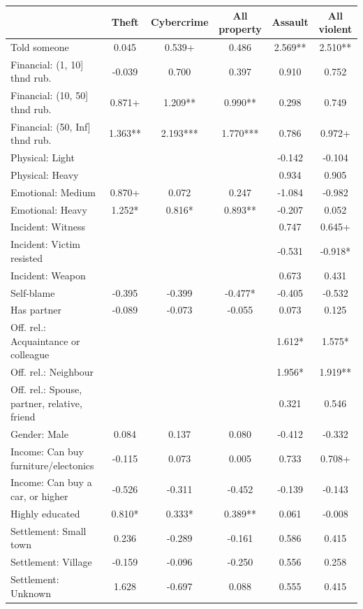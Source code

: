 \begin{tabular}{lccccc}
\toprule
  & Theft & Cybercrime & All property & Assault & All violent \\ 
\midrule\addlinespace[2.5pt]
Told someone & 0.045 & 0.539+ & 0.486 & 2.569** & 2.510** \\ 
Financial: (1, 10] thnd rub. & -0.039 & 0.700 & 0.397 & 0.910 & 0.752 \\ 
Financial: (10, 50] thnd rub. & 0.871+ & 1.209** & 0.990** & 0.298 & 0.749 \\ 
Financial: (50, Inf] thnd rub. & 1.363** & 2.193*** & 1.770*** & 0.786 & 0.972+ \\ 
Physical: Light &  &  &  & -0.142 & -0.104 \\ 
Physical: Heavy &  &  &  & 0.934 & 0.905 \\ 
Emotional: Medium & 0.870+ & 0.072 & 0.247 & -1.084 & -0.982 \\ 
Emotional: Heavy & 1.252* & 0.816* & 0.893** & -0.207 & 0.052 \\ 
Incident: Witness &  &  &  & 0.747 & 0.645+ \\ 
Incident: Victim resisted &  &  &  & -0.531 & -0.918* \\ 
Incident: Weapon &  &  &  & 0.673 & 0.431 \\ 
Self-blame & -0.395 & -0.399 & -0.477* & -0.405 & -0.532 \\ 
Has partner & -0.089 & -0.073 & -0.055 & 0.073 & 0.125 \\ 
Off. rel.: Acquaintance or colleague &  &  &  & 1.612* & 1.575* \\ 
Off. rel.: Neighbour &  &  &  & 1.956* & 1.919** \\ 
Off. rel.: Spouse, partner, relative, friend &  &  &  & 0.321 & 0.546 \\ 
Gender: Male & 0.084 & 0.137 & 0.080 & -0.412 & -0.332 \\ 
Income: Can buy furniture/electonics & -0.115 & 0.073 & 0.005 & 0.733 & 0.708+ \\ 
Income: Can buy a car, or higher & -0.526 & -0.311 & -0.452 & -0.139 & -0.143 \\ 
Highly educated & 0.810* & 0.333* & 0.389** & 0.061 & -0.008 \\ 
Settlement: Small town & 0.236 & -0.289 & -0.161 & 0.586 & 0.415 \\ 
Settlement: Village & -0.159 & -0.096 & -0.250 & 0.556 & 0.258 \\ 
Settlement: Unknown & 1.628 & -0.697 & 0.088 & 0.555 & 0.415 \\ 

\end{tabular}
